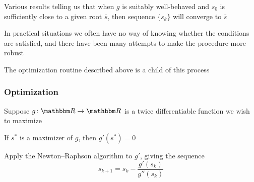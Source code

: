 \begin{frame}

    \vspace{2em}
    Various results telling us that when $g$ is suitably well-behaved
    and $s_0$ is sufficiently close to a given root $\bar s$, then sequence
    $\{s_k\}$ will converge to $\bar s$
    
    \vspace{.7em}
    In practical situations we often have no
    way of knowing whether the conditions are satisfied, and there have been many
    attempts to make the procedure more robust
    
    \vspace{.7em}
    The \R{} optimization routine described above is a child of this process
    
\end{frame}

\begin{frame}\frametitle{Optimization}

    \vspace{.7em}
    Suppose  $g \colon \RR \to \RR$ is a twice differentiable
    function we wish to maximize
    
    \vspace{.7em}
    If $s^*$ is a maximizer of 
    $g$, then $g'(s^*) = 0$
    
    \vspace{.7em}
    Apply the Newton--Raphson algorithm to $g'$, giving the sequence
    \begin{equation*}
        \label{eq:1dnr}
        s_{k+1} = s_k - \frac{g'(s_k)}{g''(s_k)} 
    \end{equation*}
    
\end{frame}

